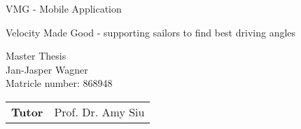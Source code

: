  

\pagestyle{empty} %



\newenvironment{conditions}
  {\par\vspace{\abovedisplayskip}\noindent
   \begin{tabular}{>{$}l<{$} @{} >{${}}c<{{}$} @{} l}}
  {\end{tabular}\par\vspace{\belowdisplayskip}}




\begin{center}
\begin{Huge}
VMG - Mobile Application\\
\end{Huge}

\begin{Large}
Velocity Made Good - supporting sailors to find best driving angles\\
\end{Large}
\vspace{8mm}
Master Thesis\\
\vspace{0.4cm}
\vspace{2 cm}
Jan-Jasper Wagner \\
Matricle number: 868948\\
\vspace{8cm}
\begin{tabular}{rl}
{\bfseries Tutor} & Prof. Dr. Amy Siu\\
\end{tabular}

\end{center}
\clearpage

\pagestyle{scrheadings}
\chead{\rightmark}  %
\cfoot{\pagemark} %

\tableofcontents %

